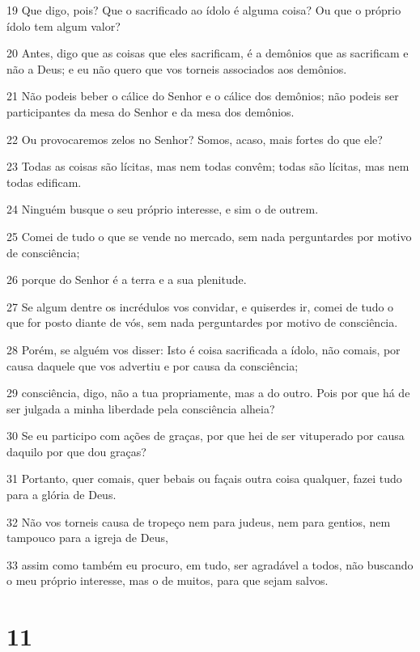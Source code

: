 \par 19 Que digo, pois? Que o sacrificado ao ídolo é alguma coisa? Ou que o próprio ídolo tem algum valor?
\par 20 Antes, digo que as coisas que eles sacrificam, é a demônios que as sacrificam e não a Deus; e eu não quero que vos torneis associados aos demônios.
\par 21 Não podeis beber o cálice do Senhor e o cálice dos demônios; não podeis ser participantes da mesa do Senhor e da mesa dos demônios.
\par 22 Ou provocaremos zelos no Senhor? Somos, acaso, mais fortes do que ele?
\par 23 Todas as coisas são lícitas, mas nem todas convêm; todas são lícitas, mas nem todas edificam.
\par 24 Ninguém busque o seu próprio interesse, e sim o de outrem.
\par 25 Comei de tudo o que se vende no mercado, sem nada perguntardes por motivo de consciência;
\par 26 porque do Senhor é a terra e a sua plenitude.
\par 27 Se algum dentre os incrédulos vos convidar, e quiserdes ir, comei de tudo o que for posto diante de vós, sem nada perguntardes por motivo de consciência.
\par 28 Porém, se alguém vos disser: Isto é coisa sacrificada a ídolo, não comais, por causa daquele que vos advertiu e por causa da consciência;
\par 29 consciência, digo, não a tua propriamente, mas a do outro. Pois por que há de ser julgada a minha liberdade pela consciência alheia?
\par 30 Se eu participo com ações de graças, por que hei de ser vituperado por causa daquilo por que dou graças?
\par 31 Portanto, quer comais, quer bebais ou façais outra coisa qualquer, fazei tudo para a glória de Deus.
\par 32 Não vos torneis causa de tropeço nem para judeus, nem para gentios, nem tampouco para a igreja de Deus,
\par 33 assim como também eu procuro, em tudo, ser agradável a todos, não buscando o meu próprio interesse, mas o de muitos, para que sejam salvos.

\chapter{11}

